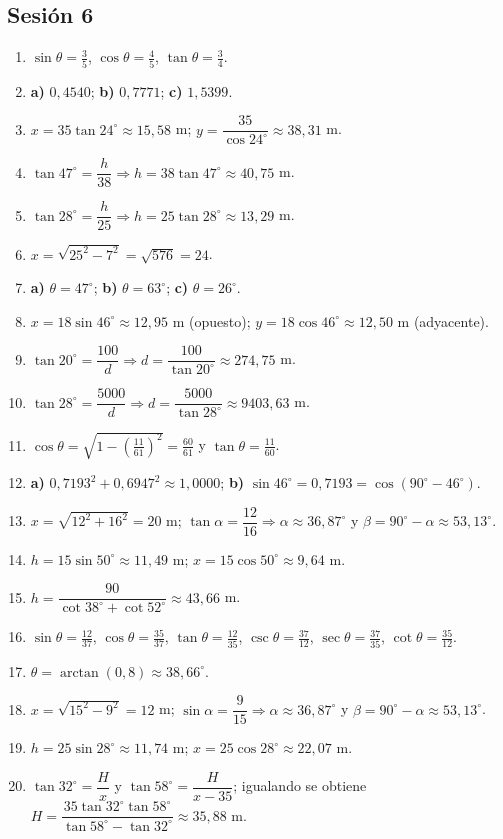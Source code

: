\documentclass[12pt, letterpaper]{article}
\providecommand{\sen}{\sin}
\begin{document}
\subsection*{Sesión 6}
\begin{enumerate}[leftmargin=*, label=\textbf{\arabic*.}]
  \item $\sen\theta=\frac{3}{5}$, $\cos\theta=\frac{4}{5}$, $\tan\theta=\frac{3}{4}$.
  \item \textbf{a)} $0{,}4540$; \quad \textbf{b)} $0{,}7771$; \quad \textbf{c)} $1{,}5399$.
  \item $x=35\tan 24^{\circ}\approx 15{,}58$ m; $y=\dfrac{35}{\cos 24^{\circ}}\approx 38{,}31$ m.
  \item $\tan 47^{\circ}=\dfrac{h}{38}\Rightarrow h=38\tan 47^{\circ}\approx 40{,}75$ m.
  \item $\tan 28^{\circ}=\dfrac{h}{25}\Rightarrow h=25\tan 28^{\circ}\approx 13{,}29$ m.
  \item $x=\sqrt{25^2-7^2}=\sqrt{576}=24$.
  \item \textbf{a)} $\theta=47^{\circ}$; \quad \textbf{b)} $\theta=63^{\circ}$; \quad \textbf{c)} $\theta=26^{\circ}$.
  \item $x=18\sen 46^{\circ}\approx 12{,}95$ m (opuesto); $y=18\cos 46^{\circ}\approx 12{,}50$ m (adyacente).
  \item $\tan 20^{\circ}=\dfrac{100}{d}\Rightarrow d=\dfrac{100}{\tan 20^{\circ}}\approx 274{,}75$ m.
  \item $\tan 28^{\circ}=\dfrac{5000}{d}\Rightarrow d=\dfrac{5000}{\tan 28^{\circ}}\approx 9403{,}63$ m.
  \item $\cos\theta=\sqrt{1-\left(\frac{11}{61}\right)^2}=\frac{60}{61}$ y $\tan\theta=\frac{11}{60}$.
  \item \textbf{a)} $0{,}7193^2+0{,}6947^2\approx 1{,}0000$; \quad \textbf{b)} $\sen 46^{\circ}=0{,}7193=\cos(90^{\circ}-46^{\circ})$. \checkmark
  \item $x=\sqrt{12^2+16^2}=20$ m; $\tan\alpha=\dfrac{12}{16}\Rightarrow\alpha\approx 36{,}87^{\circ}$ y $\beta=90^{\circ}-\alpha\approx 53{,}13^{\circ}$.
  \item $h=15\sen 50^{\circ}\approx 11{,}49$ m; $x=15\cos 50^{\circ}\approx 9{,}64$ m.
  \item $h=\dfrac{90}{\cot 38^{\circ}+\cot 52^{\circ}}\approx 43{,}66$ m.
  \item $\sen\theta=\frac{12}{37}$, $\cos\theta=\frac{35}{37}$, $\tan\theta=\frac{12}{35}$, $\csc\theta=\frac{37}{12}$, $\sec\theta=\frac{37}{35}$, $\cot\theta=\frac{35}{12}$.
  \item $\theta=\arctan\left(0{,}8\right)\approx 38{,}66^{\circ}$.
  \item $x=\sqrt{15^2-9^2}=12$ m; $\sen\alpha=\dfrac{9}{15}\Rightarrow\alpha\approx 36{,}87^{\circ}$ y $\beta=90^{\circ}-\alpha\approx 53{,}13^{\circ}$.
  \item $h=25\sen 28^{\circ}\approx 11{,}74$ m; $x=25\cos 28^{\circ}\approx 22{,}07$ m.
  \item $\tan 32^{\circ}=\dfrac{H}{x}$ y $\tan 58^{\circ}=\dfrac{H}{x-35}$; igualando se obtiene $H=\dfrac{35\tan 32^{\circ}\tan 58^{\circ}}{\tan 58^{\circ}-\tan 32^{\circ}}\approx 35{,}88$ m.
\end{enumerate}
\end{document}

